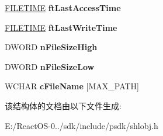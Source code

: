 \begin{DoxyCompactItemize}
\hyperlink{struct___f_i_l_e_t_i_m_e}{F\+I\+L\+E\+T\+I\+ME} {\bfseries ft\+Last\+Access\+Time}
\item 
\mbox{\label{struct___f_i_l_e_d_e_s_c_r_i_p_t_o_r_w_a01e95e2156460e0e92b495196403fa2c}} 
\hyperlink{struct___f_i_l_e_t_i_m_e}{F\+I\+L\+E\+T\+I\+ME} {\bfseries ft\+Last\+Write\+Time}
\item 
\mbox{\label{struct___f_i_l_e_d_e_s_c_r_i_p_t_o_r_w_aa72fce689977a13fccf0a758c46a8c71}} 
D\+W\+O\+RD {\bfseries n\+File\+Size\+High}
\item 
\mbox{\label{struct___f_i_l_e_d_e_s_c_r_i_p_t_o_r_w_a9f6e3dc40ff674521660d00ad6db9c1b}} 
D\+W\+O\+RD {\bfseries n\+File\+Size\+Low}
\item 
\mbox{\label{struct___f_i_l_e_d_e_s_c_r_i_p_t_o_r_w_a4d11817f83cccbad222471cb92ac1fe8}} 
W\+C\+H\+AR {\bfseries c\+File\+Name} \mbox{[}M\+A\+X\+\_\+\+P\+A\+TH\mbox{]}
\end{DoxyCompactItemize}


该结构体的文档由以下文件生成\+:\begin{DoxyCompactItemize}
\item 
E\+:/\+React\+O\+S-\/0../sdk/include/psdk/shlobj.\+h\end{DoxyCompactItemize}
